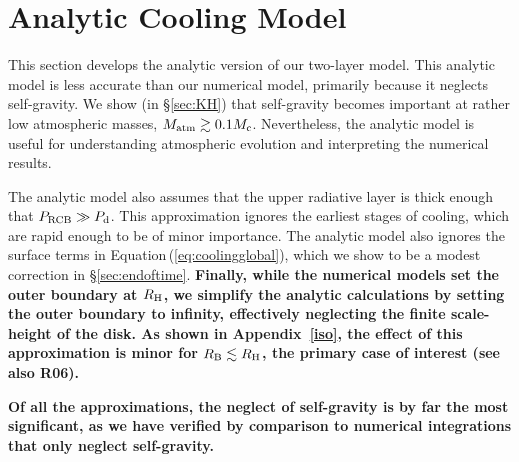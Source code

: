\documentclass[apj, numberedappendix]{emulateapj}
\newcommand{\Eq}[1]{Equation\,(\ref{#1})}
\newcommand{\App}[1]{Appendix~\ref{#1}}
\newcommand{\RB}{R_{\rm B}}
\newcommand{\RH}{R_{\rm H}}
\newcommand{\co}{_{\rm c}}
\newcommand{\di}{_{\rm d}}
\newcommand{\cb}{_{\rm RCB}}
\begin{document}
\section{Analytic Cooling Model}
\label{sec:coolingan}

This section develops the analytic version of our two-layer model. This analytic model is less accurate than our numerical model, primarily because it neglects self-gravity.  We show (in \S\ref{sec:KH}) that self-gravity becomes important at rather low atmospheric masses, $M_{\rm atm} \gtrsim 0.1 M\co$.  Nevertheless, the analytic model is useful for understanding atmospheric evolution and interpreting the numerical results.

The analytic model also assumes that the upper radiative layer is thick enough that $P\cb \gg P\di$.  This approximation ignores the earliest stages of cooling, which are rapid enough to be of minor importance.  The analytic model also ignores the surface terms in \Eq{eq:coolingglobal}, which we show to be a modest correction in \S\ref{sec:endoftime}.  \textbf{Finally, while the numerical models set the outer boundary at $\RH$, we simplify the analytic calculations by setting the outer boundary to infinity, effectively neglecting the finite scale-height of the disk.   As shown in \App{iso}, the effect of this approximation is minor for $\RB \lesssim \RH$, the primary case of interest (see also R06).}

\textbf{Of all the approximations, the neglect of self-gravity is by far the most significant, as we have verified by comparison to numerical integrations that only neglect self-gravity.}
\end{document}
